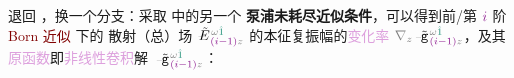 退回 ，换一个分支：采取  中的另一个 \textbf{\textcolor{NavyBlue}{泵浦未耗尽}近似条件}，可以得到前/第 $\textcolor{Plum}{i}$ 阶 \textcolor{Maroon}{Born 近似}  下的 \textcolor{NavyBlue}{散射（总）场} $\xint{\mathcolor{gray}{-}}{255}{\tilde{E}}^{\;\! \mathcolor{gray}{\omega} \textcolor{PineGreen}{\hat{1}}}_{\;\! \textcolor{Plum}{(i-1)} \mathcolor{gray}{z}}$ 的\textcolor{PineGreen}{本征复振幅}的\textcolor{Plum}{变化率} $\mathcolor{gray}{\nabla_z} \xint{\begin{smallmatrix} ~ \\ {}^{}_{\mathcolor{gray}{-}} \\ ~ \end{smallmatrix}}{09}{\tilde{\mathtt{g}}}^{\;\!\mathcolor{gray}{\omega} \textcolor{PineGreen}{\hat{1}}}_{\;\! \textcolor{Plum}{(i-1)} \mathcolor{gray}{z}}$，及其\textcolor{Plum}{原函数}即\textcolor{Plum}{非线性卷积}解 $\xint{\begin{smallmatrix} ~ \\ {}^{}_{\mathcolor{gray}{-}} \\ ~ \end{smallmatrix}}{09}{\tilde{\mathtt{g}}}^{\;\! \mathcolor{gray}{\omega} \textcolor{PineGreen}{\hat{1}}}_{\;\! \textcolor{Plum}{(i-1)} \mathcolor{gray}{z}}$：
